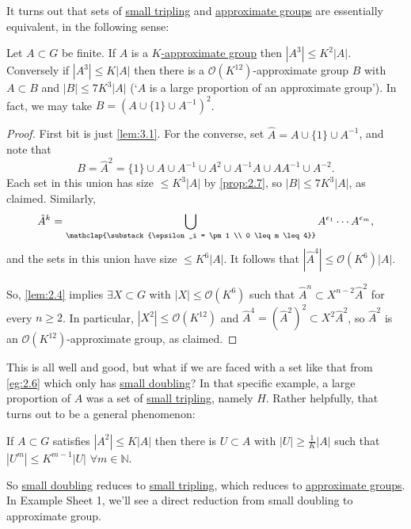 \documentclass{article}
\numberwithin{equation}{section}
\begin{document}
It turns out that sets of \hyperlink{def:tripling}{small tripling} and \hyperlink{def:appGroup}{approximate groups} are essentially equivalent, in the following sense:
\begin{nprop}\label{prop:3.2}
  Let $A \subset G$ be finite.
  If $A$ is a \hyperlink{def:appGroup}{$K$-approximate group} then $|A^3| \leq K^2 |A|$.
  Conversely if $|A^3| \leq K|A|$ then there is a $\mathcal{O}(K^{12})$-approximate group $B$ with $A \subset B$ and $|B| \leq 7 K^3 |A|$ (`$A$ is a large proportion of an approximate group').
  In fact, we may take $B = (A \cup \{1\} \cup A^{-1})^2$.
\end{nprop}
\begin{proof}
  First bit is just \cref{lem:3.1}. For the converse, set $\hat{A} = A \cup \{1\} \cup A^{-1}$, and note that
  \begin{equation*}
    B = \hat{A}^2 = \{1\} \cup A \cup A^{-1} \cup A^2 \cup A^{-1} A \cup A A^{-1} \cup A^{-2}.
  \end{equation*}
  Each set in this union has size $\leq K^3 |A|$ by \cref{prop:2.7}, so $|B| \leq 7 K^3 |A|$, as claimed. Similarly,
  \begin{equation*}
    \hat{A}^k = \bigcup_{\mathclap{\substack{\epsilon_i = \pm 1 \\ 0 \leq m \leq 4}}} A^{\epsilon_1} \dotsm A^{\epsilon_m},
  \end{equation*}
  and the sets in this union have size $\leq K^6 |A|$.
  It follows that $|\hat{A}^4| \leq \mathcal{O}(K^6)|A|$.

  So, \cref{lem:2.4} implies $\exists X \subset G$ with $|X| \leq \mathcal{O}(K^6)$ such that $\hat{A}^n \subset X^{n-2} \hat{A}^2$ for every $n \geq 2$.
  In particular, $|X^2| \leq \mathcal{O}(K^{12})$ and $\hat{A}^4 = (\hat{A}^2)^2 \subset X^2 \hat{A}^2$, so $\hat{A}^2$ is an $\mathcal{O}(K^{12})$-approximate group, as claimed.
\end{proof}
This is all well and good, but what if we are faced with a set like that from \cref{eg:2.6} which only has \hyperlink{def:doubling}{small doubling}?
In that specific example, a large proportion of $A$ was a set of \hyperlink{def:tripling}{small tripling}, namely $H$. Rather helpfully, that turns out to be a general phenomenon:

\begin{nthm}\label{thm:3.3}
  If $A \subset G$ satisfies $|A^2| \leq K|A|$ then there is $U \subset A$ with $|U| \geq \frac{1}{K} |A|$ such that $|U^m| \leq K^{m-1} |U|$ $\forall m \in \mathbb{N}$.
\end{nthm}
So \hyperlink{def:doubling}{small doubling} reduces to \hyperlink{def:tripling}{small tripling}, which reduces to \hyperlink{def:appGroup}{approximate groups}. In Example Sheet 1, we'll see a direct reduction from small doubling to approximate group.
\end{document}
